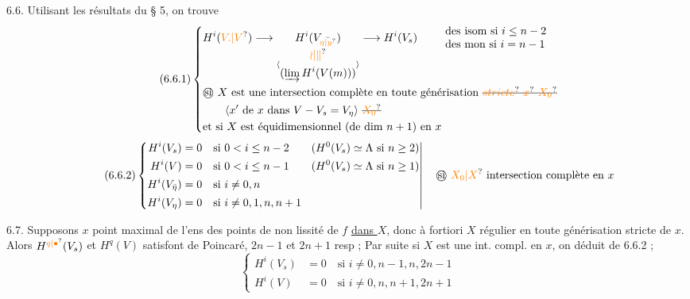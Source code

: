 6.6. Utilisant les résultats du § 5, on trouve
\[
\tag*{(6.6.1)}\left\{\begin{aligned}
&H^i(\unsure{V.|V})\longrightarrow\underset{\inserted{\begin{gathered}\unsure{\wr|\Vert}\\(\varinjlim H^i(V(m)))\end{gathered}}}{H^i(V_{\bar{\unsure{\eta|y}}})}\longrightarrow H^i(V_s)\qquad\begin{array}{l}\text{des isom si }i\leq n-2\\\text{des mon si }i=n-1\end{array}\\
&\text{\textcircled{si}}\ X\text{ est une intersection complète en toute générisation}\ \deleted{\unsure{stricte}~\unsure{x}\ \unsure{X_0}}\\
&\qquad\inserted{x'\text{ de }x\text{ dans }V-V_s=V_\eta}\ \deleted{\unsure{X_0}}\\
&\text{et si }X\text{ est équidimensionnel (de dim }n+1)\text{ en }x
\end{aligned}\right.
\]
\[
\tag*{(6.6.2)}\left\{\begin{aligned}
H^i(V_s)&=0\quad\text{si }0<i\leq n-2\qquad(H^0(V_s)\simeq\Lambda\text{ si }n\geq2)\\
H^i(V)&=0\quad\text{si }0<i\leq n-1\qquad(H^0(V_s)\simeq\Lambda\text{ si }n\geq1)\\
H^i(V_{\bar\eta})&=0\quad\text{si }i\ne0,n\\
H^i(V_\eta)&=0\quad\text{si }i\ne0,1,n,n+1
\end{aligned}\right|\quad\text{\textcircled{si}}\ \unsure{X_0|X}\text{ intersection complète en }x
\]

6.7. Supposons  $x$ point maximal de l'ens des points de non lissité de $f$ \uline{dans $X$}, donc à fortiori $X$ régulier en toute générisation stricte de $x$. Alors $H^{\unsure{q|\bullet}}(V_s)$ et $H^q(V)$ satisfont   de Poincaré,   $2n-1$ et $2n+1$ resp ; Par suite si $X$ est  une int. compl. en $x$, on déduit de 6.6.2 ; 
\[
\tag*{(6.7.1)}\left\{\begin{aligned}
H^i(V_s)&=0\quad\text{si }i\ne0,n-1,n,2n-1\\
H^i(V)&=0\quad\text{si }i\ne0,n,n+1,2n+1
\end{aligned}\right.
\]
\inserted{$\left[\begin{aligned}&\text{et }H^0(V_s)\simeq\Lambda\ \deleted{\text{si }\unsure{n\geq2}}\\&H^{2n-1}(V_s)\simeq\Lambda(-n\unsure{+|-}1)\ \deleted{\unsure{\text{et}}}\end{aligned}\middle|\text{si }n\geq2\right.$}

